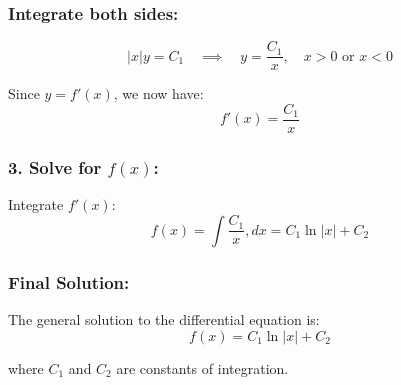\documentclass[a4paper,12pt]{book}
\begin{document}
\subsubsection{Integrate both sides:}

\[
|x| y = C_1 \quad \implies \quad y = \frac{C_1}{x}, \quad x > 0 \text{ or } x < 0
\]

Since \( y = f'(x) \), we now have:
\[
f'(x) = \frac{C_1}{x}
\]

\subsubsection{3. Solve for \( f(x) \):}

Integrate \( f'(x) \):
\[
f(x) = \int \frac{C_1}{x} , dx = C_1 \ln|x| + C_2
\]

\subsubsection{Final Solution:}

The general solution to the differential equation is:
\[
f(x) = C_1 \ln|x| + C_2
\]

where \( C_1 \) and \( C_2 \) are constants of integration.
\end{document}
